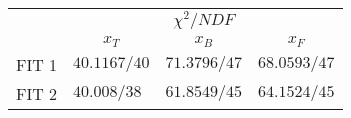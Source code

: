 \begin{tabular}{|l|lll|}
\hline
 & \multicolumn{3}{c|}{$\chi^2/NDF$} \\ \cline{2-4} 
      & \multicolumn{1}{c|}{$x_T$}          & \multicolumn{1}{c|}{$x_B$}          & \multicolumn{1}{c|}{$x_F$} \\ \hline
FIT 1 & \multicolumn{1}{l|}{$40.1167 / 40$} & \multicolumn{1}{l|}{$71.3796 / 47$} & $68.0593 / 47$             \\ \hline
FIT 2 & \multicolumn{1}{l|}{$40.008 / 38$}  & \multicolumn{1}{l|}{$61.8549 / 45$} & $64.1524 / 45$             \\ \hline
\end{tabular}
